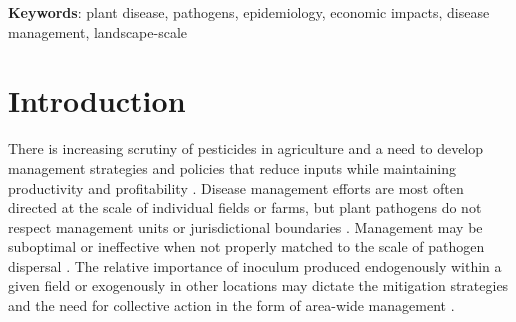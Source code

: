 \documentclass[10pt,a4paper]{article}
\begin{document}
\begin{abstract}
SIGNIFICANCE
Our analysis addresses a multifaceted challenge in agricultural disease management where epidemic control decisions must account for interactions between pathogen biology, management practices, market conditions, and regional-scale disease transmission. This research provides a framework for formally understanding factors that influence the cost of disease in complex agricultural systems where pathogens disperse across management units.
\end{abstract}

\textbf{Keywords}: plant disease, pathogens, epidemiology, economic impacts, disease management, landscape-scale

\newpage

\tableofcontents

\newpage
\section{Introduction}

%

There is increasing scrutiny of pesticides in agriculture and a need to develop management strategies and policies that reduce inputs while maintaining productivity and profitability \parencite{Pimentel2005, Waard1993}. Disease management efforts are most often directed at the scale of individual fields or farms, but plant pathogens do not respect management units or jurisdictional boundaries \parencite{Gilligan2008}. Management may be suboptimal or ineffective when not properly matched to the scale of pathogen dispersal \parencite{Gilligan2007}. The relative importance of inoculum produced endogenously within a given field or exogenously in other locations may dictate the mitigation strategies and the need for collective action in the form of area-wide management \parencite{Irwin1999}.
\end{document}
